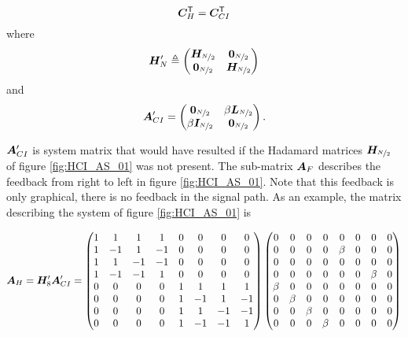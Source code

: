\begin{equation}
    \bm{C}^\mathsf{T}_H = \bm{C}^\mathsf{T}_{CI}
\end{equation}
where
\begin{equation}
    \bm{H}'_N \triangleq
    \begin{pmatrix}
        \bm{H_}{\nicefrac{N}{2}} & \bm{0}_{\nicefrac{N}{2}} \\
        \bm{0}_{\nicefrac{N}{2}} & \bm{H_}{\nicefrac{N}{2}}
    \end{pmatrix}
\end{equation}
and
\begin{equation}
    \bm{A}'_{CI} =
    \begin{pmatrix}
        \bm{0}_{\nicefrac{N}{2}} & \beta \bm{L}_{\nicefrac{N}{2}} \\
        \beta \bm{I}_{\nicefrac{N}{2}} & \bm{0}_{\nicefrac{N}{2}}
    \end{pmatrix}.
\end{equation}

$\bm{A}'_{CI}$ is system matrix that would have resulted if the Hadamard matrices $\bm{H_}{\nicefrac{N}{2}}$ of figure \ref{fig:HCI_AS_01} was not present.
The sub-matrix $\bm{A}_F$ describes the feedback from right to left in figure \ref{fig:HCI_AS_01}. Note that this feedback is only graphical, there is no feedback in the signal path. As an example, the matrix describing the system of figure \ref{fig:HCI_AS_01} is

\begin{equation}
    \bm{A}_H = \bm{H}'_8 \bm{A}'_{CI} =
    \begin{pmatrix}
        1 & 1 & 1 & 1 & 0 & 0 & 0 & 0 \\
        1 & -1 & 1 & -1 & 0 & 0 & 0 & 0 \\
        1 & 1 & -1 & -1 & 0 & 0 & 0 & 0 \\
        1 & -1 & -1 & 1 & 0 & 0 & 0 & 0 \\
        0 & 0 & 0 & 0 & 1 & 1 & 1 & 1 \\
        0 & 0 & 0 & 0 & 1 & -1 & 1 & -1 \\
        0 & 0 & 0 & 0 & 1 & 1 & -1 & -1 \\
        0 & 0 & 0 & 0 & 1 & -1 & -1 & 1
    \end{pmatrix}
    \begin{pmatrix}
        0 & 0 & 0 & 0 & 0 & 0 & 0 & 0 \\
        0 & 0 & 0 & 0 & \beta & 0 & 0 & 0 \\
        0 & 0 & 0 & 0 & 0 & 0 & 0 & 0 \\
        0 & 0 & 0 & 0 & 0 & 0 & \beta & 0 \\
        \beta & 0 & 0 & 0 & 0 & 0 & 0 & 0 \\
        0 & \beta & 0 & 0 & 0 & 0 & 0 & 0 \\
        0 & 0 & \beta & 0 & 0 & 0 & 0 & 0 \\
        0 & 0 & 0 & \beta & 0 & 0 & 0 & 0
    \end{pmatrix}
\end{equation}

